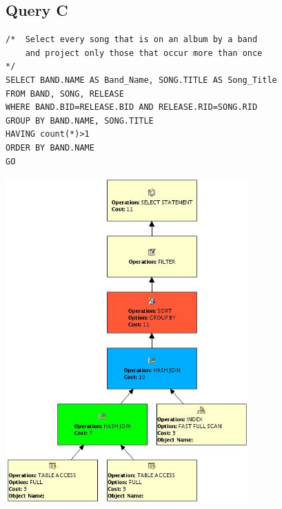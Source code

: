 \documentclass{report}
\begin{document}
\subsection*{Query C}
\begin{verbatim}
/*  Select every song that is on an album by a band
    and project only those that occur more than once
*/
SELECT BAND.NAME AS Band_Name, SONG.TITLE AS Song_Title
FROM BAND, SONG, RELEASE
WHERE BAND.BID=RELEASE.BID AND RELEASE.RID=SONG.RID
GROUP BY BAND.NAME, SONG.TITLE
HAVING count(*)>1
ORDER BY BAND.NAME
GO
\end{verbatim}
\includegraphics[width=0.7\textwidth]{Q1}
\end{document}
